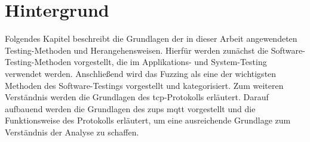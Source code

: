 
\section{Hintergrund}\label{sec:hintergrund}
Folgendes Kapitel beschreibt die Grundlagen der in dieser Arbeit angewendeten Testing-Methoden und Herangehensweisen.
Hierfür werden zunächst die Software-Testing-Methoden vorgestellt, die im Applikations- und System-Testing verwendet werden.
Anschließend wird das Fuzzing als eine der wichtigsten Methoden des Software-Testings vorgestellt und kategorisiert.
Zum weiteren Verständnis werden die Grundlagen des \gls{tcp}-Protokolls erläutert.
Darauf aufbauend werden die Grundlagen des \gls{zup}s \gls{mqtt} vorgestellt und die Funktionsweise des Protokolls erläutert,
um eine ausreichende Grundlage zum Verständnis der Analyse zu schaffen.




